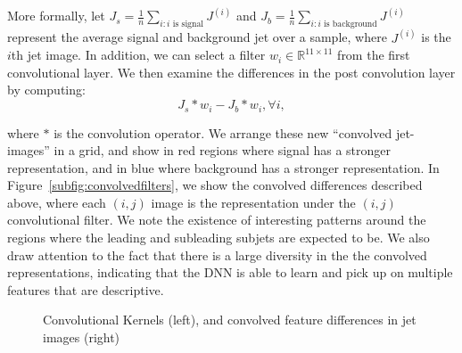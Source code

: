More formally, let $J_s=\frac{1}{n}\sum_{i:i\text{ is signal}} J^{(i)}$ and $J_b=\frac{1}{n}\sum_{i:i\text{ is background}}J^{(i)}$ represent the average signal and background jet over a sample, where $J^{(i)}$ is the $i$th jet image. In addition, we can select a filter $w_i\in\mathbb{R}^{11\times11}$ from the first convolutional layer. We then examine the differences in the post convolution layer by computing:
\begin{equation}
  J_s \ast w_i - J_b \ast w_i, \forall i,
\end{equation}

\noindent where $\ast$ is the convolution operator. We arrange these new ``convolved jet-images'' in a grid, and show in red regions where signal has a stronger representation, and in blue where background has a stronger representation. In Figure~\ref{subfig:convolvedfilters}, we show the convolved differences described above, where each $(i, j)$ image is the representation under the $(i, j)$ convolutional filter. We note the existence of interesting patterns around the regions where the leading and subleading subjets are expected to be. We also draw attention to the fact that there is a large diversity in the the convolved representations, indicating that the DNN is able to learn and pick up on multiple features that are descriptive.
\begin{figure}[bt]
  \begin{center}
      \caption{Convolutional Kernels (left), and convolved feature differences in jet images (right)}
      \label{fig:convkernels}

    \end{center}
\end{figure}


